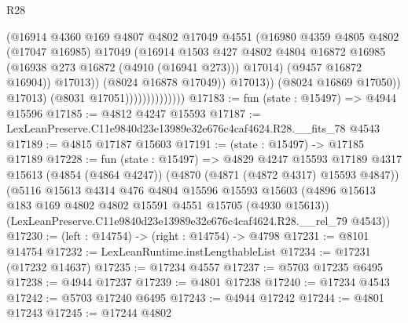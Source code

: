 \begin{lexlean}{R28}
\begin{coremodule}
                                          (@16914
                                            @4360
                                            @169
                                            @4807
                                            @4802
                                            @17049
                                            @4551
                                            (@16980
                                              @4359
                                              @4805
                                              @4802
                                              (@17047 @16985)
                                              @17049
                                              (@16914
                                                @1503
                                                @427
                                                @4802
                                                @4804
                                                @16872
                                                @16985
                                                (@16938 @273 @16872 (@4910 (@16941 @273)))
                                                @17014)
                                              (@9457 @16872 @16904))
                                            @17013))
                                        (@8024 @16878 @17049))
                                      @17013))
                                  (@8024 @16869 @17050))
                                @17013)
                              (@8031 @17051))))))))))))))
@17183 := fun (state : @15497) => @4944 @15596
@17185 := @4812 @4247 @15593
@17187 := LexLeanPreserve.C11e9840d23e13989e32e676c4caf4624.R28.__fits_78 @4543
@17189 := @4815 @17187 @15603
@17191 := (state : @15497) -> @17185 @17189
@17228 := fun (state : @15497) =>
  @4829
    @4247
    @15593
    @17189
    @4317
    @15613
    (@4854 (@4864 @4247))
    (@4870 (@4871 (@4872 @4317) @15593 @4847))
    (@5116
      @15613
      @4314
      @476
      @4804
      @15596
      @15593
      @15603
      (@4896 @15613 @183 @169 @4802 @4802 @15591 @4551 @15705 (@4930 @15613))
      (LexLeanPreserve.C11e9840d23e13989e32e676c4caf4624.R28.__rel_79 @4543))
@17230 := (left : @14754) -> (right : @14754) -> @4798
@17231 := @8101 @14754
@17232 := LexLeanRuntime.instLengthableList
@17234 := @17231 (@17232 @14637)
@17235 := @17234 @4557
@17237 := @5703 @17235 @6495
@17238 := @4944 @17237
@17239 := @4801 @17238
@17240 := @17234 @4543
@17242 := @5703 @17240 @6495
@17243 := @4944 @17242
@17244 := @4801 @17243
@17245 := @17244 @4802

\end{coremodule}
\end{lexlean}
